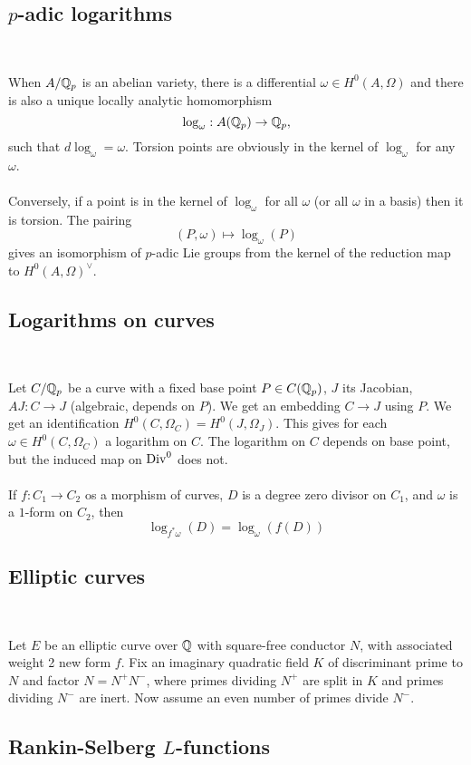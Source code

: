 \documentclass[12pt,amsfont]{amsart}
\begin{document}
\subsection{$p$-adic logarithms}
{\ }

When  $A/{\mathbb Q}_p$ is an abelian variety, there is a differential $\omega \in H^0(A, \Omega)$ and there is also a unique locally analytic homomorphism
\[
\log_\omega : A({\mathbb Q}_p) \rightarrow {\mathbb Q}_p,
\]
such that $d \log_\omega = \omega.$   Torsion points are obviously in the kernel of $\log_\omega$ for any $\omega$. \\ \\
Conversely, if a point is in the kernel of $\log_\omega$ for all $\omega$ (or all $\omega$ in a basis) then it is torsion. The pairing 
\[(P, \omega) \mapsto \log_\omega(P) \]
gives an isomorphism of $p$-adic Lie groups from the kernel of the reduction map to $H^0(A, \Omega)^\vee$. 

\subsection{Logarithms on curves}
{\ }

Let $C/{\mathbb Q}_p$ be a curve with a fixed base point $P \in C({\mathbb Q}_p)$, $J$ its Jacobian, $AJ: C \rightarrow J$ (algebraic, depends on $P$). We get an embedding $C \rightarrow J$ using $P$. We get an identification $H^0(C, \Omega_C) = H^0(J, \Omega_J)$. This gives for each $\omega \in H^0(C, \Omega_C)$ a logarithm on $C$. 
The logarithm on $C$ depends on base point, but the induced map on $\operatorname{Div}^0$ does not. \\ \\
If $f: C_1 \rightarrow C_2$ os a morphism of curves, $D$ is a degree zero divisor on $C_1$, and $\omega$ is a $1$-form on $C_2$, then 
\[ \log_{f^\ast \omega}(D) = \log_\omega(f(D))\]


\subsection{Elliptic curves}
{\ }

Let $E$ be an elliptic curve over ${\mathbb Q}$ with square-free conductor $N$, with associated weight 2 new form $f$. Fix an imaginary quadratic field $K$ of discriminant prime to $N$ and factor $N = N^+ N^{-}$, where primes dividing $N^+$ are split in $K$ and primes dividing $N^{-}$ are inert. Now assume an even number of primes divide $N^{-}$. 


\subsection{Rankin-Selberg $L$-functions}
{\ }
\end{document}
